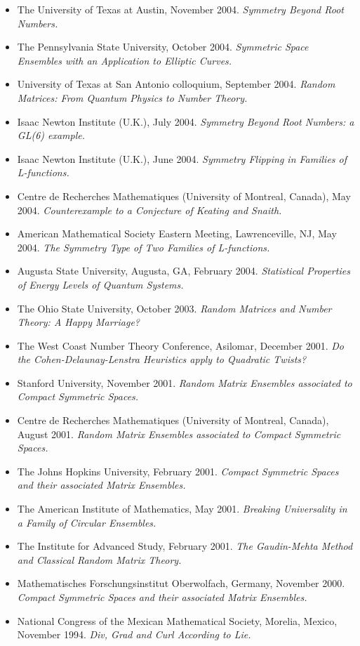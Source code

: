 \documentclass[11pt,a4paper,ragged2e,withhyper]{altacv}
\begin{document}
{\begin{itemize}
  \emph{Counterexample to a Conjecture of Keating and Snaith.}
\item The University of Texas at Austin, November 2004.
  \emph{Symmetry Beyond Root Numbers.}
\item The Pennsylvania State University, October 2004.
  \emph{Symmetric Space Ensembles with an Application to Elliptic Curves.}
\item University of Texas at San Antonio colloquium, September 2004.
  \emph{Random Matrices: From Quantum Physics to Number Theory.}
\item Isaac Newton Institute (U.K.), July 2004.
  \emph{Symmetry Beyond Root Numbers: a GL(6) example.}
\item Isaac Newton Institute (U.K.), June 2004.
  \emph{Symmetry Flipping in Families of L-functions.}
\item Centre de Recherches Mathematiques (University of Montreal, Canada), May 2004.
  \emph{Counterexample to a Conjecture of Keating and Snaith.}
\item American Mathematical Society Eastern Meeting, Lawrenceville, NJ, May 2004.
  \emph{The Symmetry Type of Two Families of L-functions.}
\item Augusta State University, Augusta, GA, February 2004.
  \emph{Statistical Properties of Energy Levels of Quantum Systems.}
\item The Ohio State University, October 2003.
  \emph{Random Matrices and Number Theory: A Happy Marriage?}
\item The West Coast Number Theory Conference, Asilomar, December 2001.
  \emph{Do the Cohen-Delaunay-Lenstra Heuristics apply to Quadratic Twists?}
\item Stanford University, November 2001.
  \emph{Random Matrix Ensembles associated to Compact Symmetric Spaces.}
\item Centre de Recherches Mathematiques (University of Montreal, Canada), August 2001.
  \emph{Random Matrix Ensembles associated to Compact Symmetric Spaces.}
\item The Johns Hopkins University, February 2001.
  \emph{Compact Symmetric Spaces and their associated Matrix Ensembles.}
\item The American Institute of Mathematics, May 2001.
  \emph{Breaking Universality in a Family of Circular Ensembles.}
\item The Institute for Advanced Study, February 2001.
  \emph{The Gaudin-Mehta Method and Classical Random Matrix Theory.}
\item Mathematisches Forschungsinstitut Oberwolfach, Germany, November 2000.
  \emph{Compact Symmetric Spaces and their associated Matrix Ensembles.}
\item National Congress of the Mexican Mathematical Society, Morelia, Mexico, November 1994.
  \emph{Div, Grad and Curl According to Lie.}
\end{itemize}
}
\end{document}
